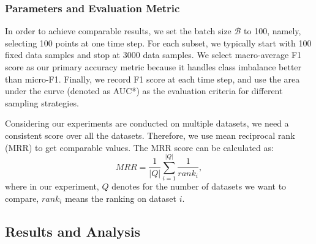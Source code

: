 \subsubsection{Parameters and Evaluation Metric}
In order to achieve comparable results, we set the batch size $\mathcal{B}$ to 100, namely, selecting 100 points at one time step. For each subset, we typically start with 100 fixed data samples and stop at 3000 data samples. 
We select macro-average F1 score as our primary accuracy metric because it handles
class imbalance better than micro-F1. Finally, we record F1 score at each time step, 
and use the area under the curve (denoted as AUC*) as the evaluation criteria for different
sampling strategies. 

Considering our experiments are conducted on multiple datasets, we need a consistent score over all the datasets. Therefore, we use mean reciprocal rank (MRR) to get comparable values. The MRR score can be calculated as:
$$MRR = \frac{1}{|Q|}\sum_{i=1}^{|Q|}\frac{1}{rank_i},$$
where in our experiment, $Q$ denotes for the number of datasets we want to compare, $rank_i$ means the ranking on dataset $i$.


\subsection{Results and Analysis}
\label{sec:results}

